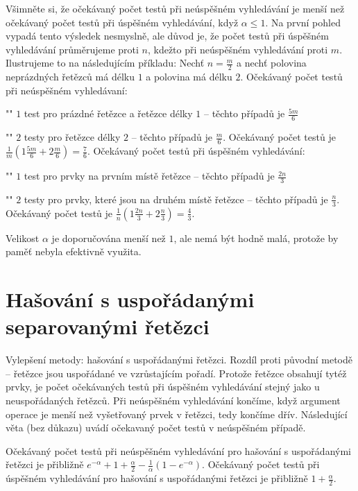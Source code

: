 \documentclass[a4paper,12pt]{article}
\begin{document}
Všimněte si, že očekávaný počet testů 
při neúspěšném vy\-hledávání je menší než očekávaný 
počet testů při úspěšném vy\-hledávání, když 
$\alpha\le 1$. Na první pohled vypadá tento výsledek nesmyslně, 
ale důvod je, že počet testů při 
úspěšném vy\-hledávání průměrujeme proti $
n$, 
kdežto při neúspěšném vy\-hledávání proti $
m$. Ilustrujeme 
to na následujícím příkladu:\newline 
Nechť $n=\frac m2$ a nechť polovina neprázdných 
řetězců má délku $1$ a polovina má délku $
2$. \newline 
Očekávaný počet testů při neúspěšném 
vyhledávaní:
\roster
\item"{}"
$1$ test pro prázdné řetězce a řetězce 
délky $1$ -- těchto případů je $\frac {5m}6$
\item"{}"
$2$ testy pro řetězce délky $2$ -- těchto případů je 
$\frac m6$.
\endroster
Očekávaný počet testů je 
$\frac 1m(1\frac {5m}6+2\frac m6)=\frac 76$.\newline 
Očekávaný počet testů při úspěšném 
vyhledávání: 
\roster
\item"{}"
$1$ test pro prvky na prvním místě řetězce -- těchto 
případů je $\frac {2n}3$
\item"{}"
$2$ testy pro prvky, které jsou na druhém místě řetězce -- těchto 
případů je $\frac n3$.
\endroster
Očekávaný počet testů je $\frac 1n(1\frac {2n}
3+2\frac n3)=\frac 43$.

Velikost $\alpha$ je doporučována menší než $
1$, ale nemá být 
hodně malá, protože by paměť nebyla efektivně využita. 

\section{Hašování s uspořádanými separovanými řetězci}

Vylepšení metody: hašování s uspořádanými řetězci.
Rozdíl proti původní metodě -- řetězce jsou 
uspořádané ve vzrůsta\-jícím pořadí. Protože 
řetězce obsahují tytéž prvky, je počet očeká\-va\-ných testů 
při úspěšném vyhledávání stejný jako u ne\-uspořádaných 
řetězců. Při neúspěšném vyhledávání končíme, 
když argument operace je menší než vyšetřovaný prvek 
v řetěz\-ci, tedy končíme dřív. Následující věta (bez 
důkazu) uvádí očekavaný počet testů v 
neúspěšném případě.

Očekávaný počet testů při 
neúspěšném vyhledávání pro hašování s uspořá\-danými 
řetězci je přibližně $e^{-\alpha}+1+\frac {\alpha}
2-\frac 1{\alpha}(1-e^{-\alpha})$. Očekávaný 
počet testů při úspěšném vyhledávání pro 
hašování s uspořádanými řetězci je 
přibližně $1+\frac {\alpha}2.$
\endproclaim
\end{document}
